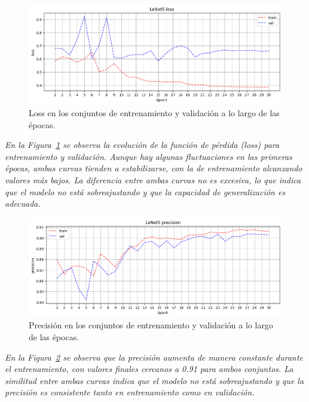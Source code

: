 \documentclass[conference]{IEEEtran}
\begin{document}
\begin{figure}[H]
    \centering
    \includegraphics[width=0.95\linewidth]{graphics-raw-da/raw-da-loss-train_val.png}
    \caption{Loss en los conjuntos de entrenamiento y validación a lo largo de las épocas.}
    \label{fig:raw-da-loss-train_val}
\end{figure}
\noindent\textit{
En la Figura~\ref{fig:raw-da-loss-train_val} se observa la evolución de la función de pérdida (loss) para entrenamiento y validación. Aunque hay algunas fluctuaciones en las primeras épocas, ambas curvas tienden a estabilizarse, con la de entrenamiento alcanzando valores más bajos. La diferencia entre ambas curvas no es excesiva, lo que indica que el modelo no está sobreajustando y que la capacidad de generalización es adecuada.
}

\begin{figure}[H]
    \centering
    \includegraphics[width=0.95\linewidth]{graphics-raw-da/raw-da-precision-train_val.png}
    \caption{Precisión en los conjuntos de entrenamiento y validación a lo largo de las épocas.}
    \label{fig:raw-da-precision-train_val}
\end{figure}
\noindent\textit{
En la Figura~\ref{fig:raw-da-precision-train_val} se observa que la precisión aumenta de manera constante durante el entrenamiento, con valores finales cercanos a 0.91 para ambos conjuntos. La similitud entre ambas curvas indica que el modelo no está sobreajustando y que la precisión es consistente tanto en entrenamiento como en validación.
}
\end{document}
